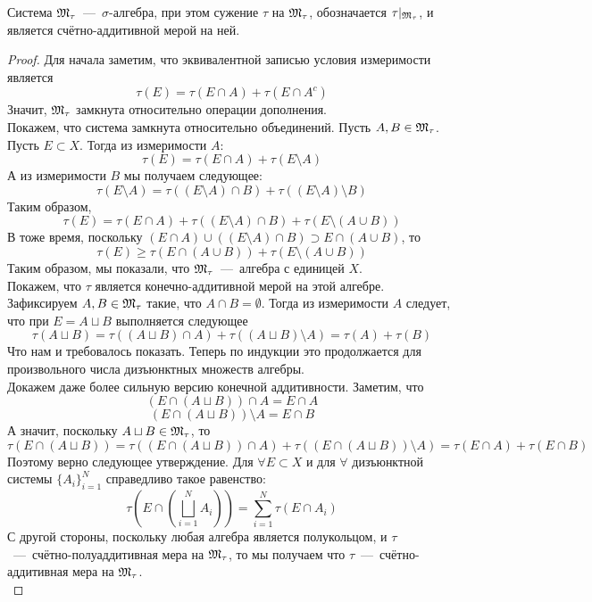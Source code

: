 \begin{theorem}
Система $\mathfrak{M}_\tau$~---~$\sigma$-алгебра, при этом сужение $\tau$ на $\mathfrak{M}_\tau$, обозначается $\tau|_{\mathfrak{M}_\tau}$, и является счётно-аддитивной мерой на ней.
\end{theorem}
\begin{proof}
Для начала заметим, что эквивалентной записью условия измеримости является \[\tau(E) = \tau(E \cap A) + \tau(E \cap A^c)\] Значит, $\mathfrak{M}_\tau$ замкнута относительно операции дополнения. \\
Покажем, что система замкнута относительно объединений. Пусть $A, B \in \mathfrak{M}_\tau$. Пусть $E \subset X$. Тогда из измеримости $A:$ \[\tau(E) = \tau(E \cap A) + \tau(E \setminus A)\] А из измеримости $B$ мы получаем следующее: \[\tau(E \setminus A) = \tau((E \setminus A) \cap B) + \tau((E \setminus A) \setminus B)\] Таким образом, \[\tau(E) = \tau(E \cap A) + \tau((E \setminus A) \cap B) + \tau(E \setminus(A \cup B))\]
В тоже время, поскольку $(E \cap A) \cup ((E \setminus A) \cap B) \supset E \cap (A \cup B)$, то \[\tau(E) \geq \tau(E \cap (A \cup B)) + \tau(E \setminus (A \cup B))\] Таким образом, мы показали, что $\mathfrak{M}_\tau$~---~алгебра с единицей $X$. \\
Покажем, что $\tau$ является конечно-аддитивной мерой на этой алгебре. Зафиксируем $A, B \in \mathfrak{M}_\tau$ такие, что $A \cap B = \emptyset$. Тогда из измеримости $A$ следует, что при $E = A \sqcup B$ выполняется следующее \[\tau(A \sqcup B) = \tau((A \sqcup B) \cap A) + \tau((A \sqcup B) \setminus A) = \tau(A) + \tau(B)\] Что нам и требовалось показать. Теперь по индукции это продолжается для произвольного числа дизъюнктных множеств алгебры. \\
Докажем даже более сильную версию конечной аддитивности. Заметим, что
\[(E \cap (A \sqcup B)) \cap A = E \cap A\]
\[(E \cap (A \sqcup B)) \setminus A = E \cap B\]
А значит, поскольку $A \sqcup B \in \mathfrak{M}_\tau$, то \[\tau(E \cap (A \sqcup B)) = \tau((E \cap (A \sqcup B)) \cap A) + \tau((E \cap (A \sqcup B)) \setminus A) = \tau(E \cap A) + \tau(E \cap B)\]
Поэтому верно следующее утверждение. Для $\forall E \subset X$ и для $\forall$ дизъюнктной системы $\{A_i\}_{i = 1}^N$ справедливо такое равенство: \[\tau(E \cap (\bigsqcup\limits_{i = 1}^N A_i)) = \sum\limits_{i = 1}^N \tau(E \cap A_i)\]
С другой стороны, поскольку любая алгебра является полукольцом, и $\tau$~---~счётно-полуаддитивная мера на $\mathfrak{M}_\tau$, то мы получаем что $\tau$~---~счётно-аддитивная мера на $\mathfrak{M}_\tau$. \\ 

\end{proof}

